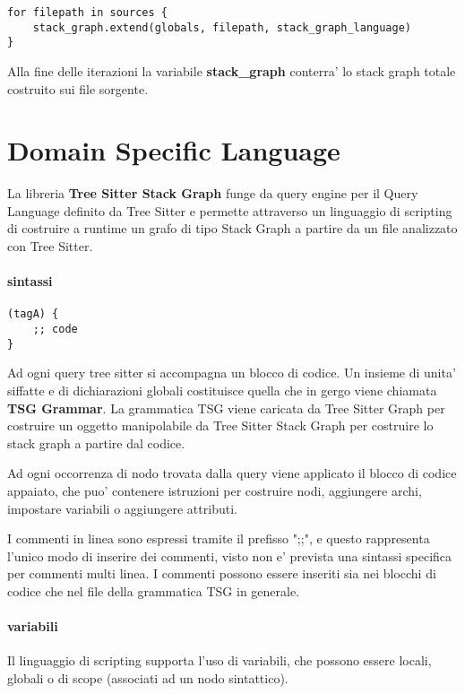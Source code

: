 \begin{Verbatim}[samepage=true]
for filepath in sources {
    stack_graph.extend(globals, filepath, stack_graph_language)
}
\end{Verbatim}

Alla fine delle iterazioni la variabile \textbf{stack\_graph} conterra' lo stack graph totale costruito sui file sorgente.

\section{Domain Specific Language}

La libreria \textbf{Tree Sitter Stack Graph} funge da query engine per il Query Language definito da Tree Sitter e permette attraverso un linguaggio di scripting di costruire a runtime un grafo di tipo Stack Graph a partire da un file analizzato con Tree Sitter.

\paragraph{sintassi}

\begin{Verbatim}[samepage=true]
(tagA) {
    ;; code
}
\end{Verbatim}

Ad ogni query tree sitter si accompagna un blocco di codice.
Un insieme di unita' siffatte e di dichiarazioni globali costituisce quella che in gergo viene chiamata \textbf{TSG Grammar}. La grammatica TSG viene caricata da Tree Sitter Graph per costruire un oggetto manipolabile da Tree Sitter Stack Graph per costruire lo stack graph a partire dal codice.

Ad ogni occorrenza di nodo trovata dalla query viene applicato il blocco di codice appaiato, che puo' contenere istruzioni per costruire nodi, aggiungere archi, impostare variabili o aggiungere attributi.

I commenti in linea sono espressi tramite il prefisso ";;", e questo rappresenta l'unico modo di inserire dei commenti, visto non e' prevista una sintassi specifica per commenti multi linea.
I commenti possono essere inseriti sia nei blocchi di codice che nel file della grammatica TSG in generale.

\paragraph{variabili}
Il linguaggio di scripting supporta l'uso di variabili, che possono essere locali, globali o di scope (associati ad un nodo sintattico).

